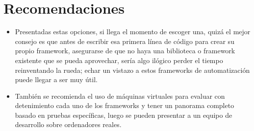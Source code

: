 \documentclass[twoside,twocolumn]{article}
\begin{document}
\section{Recomendaciones}


\begin{itemize}
\item Presentadas estas opciones, si llega el momento de escoger una, quizá el mejor consejo es que antes de escribir esa primera línea de código para crear su propio framework, asegurarse de que no haya una biblioteca o framework existente que se pueda aprovechar, sería algo ilógico perder el tiempo reinventando la rueda; echar un vistazo a estos frameworks de automatización puede llegar a ser muy útil.
\item También se recomienda el uso de máquinas virtuales para evaluar con detenimiento cada uno de los frameworks y tener un panorama completo basado en pruebas específicas, luego se pueden presentar a un equipo de desarrollo sobre ordenadores reales.
\end{itemize}



\end{document}
